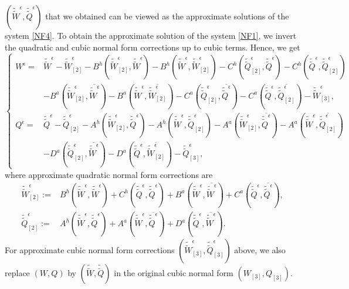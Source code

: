 \documentclass[12pt]{amsart}
\theoremstyle{remark}
\theoremstyle{definition}
\numberwithin{equation}{section}
\newcommand{\e}{\epsilon}
\begin{document}
 $(\tilde{\tilde{W}}^\epsilon, \tilde{\tilde{Q}}^\epsilon)$ that we obtained can be viewed as the approximate solutions of the system \eqref{NF4}.
 To obtain the approximate solution of the system \eqref{NF1}, we invert the quadratic and cubic normal form corrections up to cubic terms.
Hence, we get
\begin{equation} \label{WQeDef}
\begin{cases}
W^{\e}=&\tilde{\tilde{W}}^\epsilon-\tilde{\tilde{W}}^{\e}_{[2]}-B^h(\tilde{\tilde{W}}^{\e}_{[2]},\tilde{\tilde{W}}^\epsilon)-B^h(\tilde{\tilde{W}}^{\e},\tilde{\tilde{W}}^\epsilon_{[2]})-C^h(\tilde{\tilde{Q}}^\epsilon_{[2]},\tilde{\tilde{Q}}^\epsilon)
-C^h(\tilde{\tilde{Q}}^\epsilon,\tilde{\tilde{Q}}^\epsilon_{[2]})\\
&-B^a(\tilde{\tilde{W}}^\epsilon_{[2]},\overline{\tilde{\tilde{W}}^\epsilon})-B^a(\tilde{\tilde{W}}^\epsilon,\overline{\tilde{\tilde{W}}^\epsilon_{[2]}})-C^a(\tilde{\tilde{Q}}^\epsilon_{[2]},\overline{\tilde{\tilde{Q}}^\epsilon})-C^a(\tilde{\tilde{Q}}^\epsilon,\overline{\tilde{\tilde{Q}}^\epsilon_{[2]}})-\tilde{\tilde{W}}^\epsilon_{[3]},\\
Q^{\e}=&\tilde{\tilde{Q}}^\epsilon -\tilde{\tilde{Q}}^{\e}_{[2]} -A^h(\tilde{\tilde{W}}^\epsilon_{[2]},\tilde{\tilde{Q}}^\epsilon) - A^h(\tilde{\tilde{W}}^\epsilon,\tilde{\tilde{Q}}^\epsilon_{[2]}) - A^a(\tilde{\tilde{W}}^\epsilon_{[2]},\overline{\tilde{\tilde{Q}}^\epsilon}) - A^a(\tilde{\tilde{W}}^\epsilon,\overline{\tilde{\tilde{Q}}^\epsilon_{[2]}}) \\
& - D^a(\tilde{\tilde{Q}}^\epsilon_{[2]},\overline{\tilde{\tilde{W}}^\epsilon}) - D^a(\tilde{\tilde{Q}}^\epsilon,\overline{\tilde{\tilde{W}}^\epsilon_{[2]}}) -\tilde{\tilde{Q}}^\epsilon_{[3]},
\end{cases}
\end{equation}
where approximate quadratic normal form corrections are
\begin{align*}
\tilde{\tilde{W}}^{\e}_{[2]}:=&B^h(\tilde{\tilde{W}}^\epsilon,\tilde{\tilde{W}}^\epsilon)+C^h(\tilde{\tilde{Q}}^\epsilon,\tilde{\tilde{Q}}^\epsilon)+B^a(\tilde{\tilde{W}}^\epsilon,\overline{\tilde{\tilde{W}}^\epsilon})+C^a(\tilde{\tilde{Q}}^\epsilon,\overline{\tilde{\tilde{Q}}^\epsilon}),\\
\tilde{\tilde{Q}}^{\e}_{[2]}:=& A^h(\tilde{\tilde{W}}^\epsilon,\tilde{\tilde{Q}}^\epsilon)+A^a(\tilde{\tilde{W}}^\epsilon,\overline{\tilde{\tilde{Q}}^\epsilon})+D^a(\tilde{\tilde{Q}}^\epsilon,\overline{\tilde{\tilde{W}}^\epsilon}).
\end{align*}
For approximate cubic normal form corrections $(\tilde{\tilde{W}}^\epsilon_{[3]}, \tilde{\tilde{Q}}^\epsilon_{[3]})$ above, we also replace $(W, Q)$ by $(\tilde{\tilde{W}}, \tilde{\tilde{Q}})$ in the original cubic normal form $(W_{[3]}, Q_{[3]})$.
\end{document}
